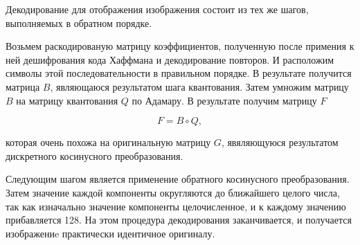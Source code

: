 \documentclass{matmex-diploma-custom}
\begin{document}
Декодирование для отображения изображения состоит из тех же шагов, выполняемых в обратном порядке.


Возьмем раскодированую матрицу коэффициентов, полученную после примения к ней дешифрования кода Хаффмана и декодирование повторов. И расположим символы этой последовательности в правильном порядке. В результате получится матрица $B$, являющаюся результатом шага квантования.
Затем умножим матрицу $B$ на матрицу квантования $Q$ по Адамару. В результате получим матрицу $F$

$$ F = B \circ Q,$$

которая очень похожа на оригинальную  матрицу $G$, явяляющуюся результатом дискретного косинусного преобразования.


Следующим шагом является применение обратного косинусного преобразования.
Затем значение каждой компоненты округляются до ближайшего целого числа, так как изначально значение компоненты целочисленное, и к каждому значению прибавляется 128. На этом процедура декодирования заканчивается, и получается изображениe практически идентичное оригиналу.






\end{document}
